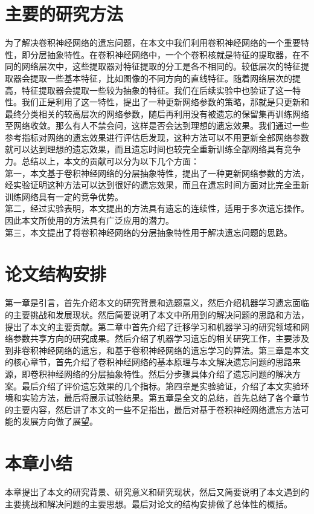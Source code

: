 \section{主要的研究方法}
为了解决卷积神经网络的遗忘问题，在本文中我们利用卷积神经网络的一个重要特性，即分层抽象特性。在卷积神经网络中，一个个卷积核就是特征的提取器，在不同的网络层次中，这些提取器对特征提取的分工是各不相同的。较低层次的特征提取器会提取一些基本特征，比如图像的不同方向的直线特征。随着网络层次的提高，特征提取器会提取一些较为抽象的特征。我们在后续实验中也验证了这一特性。我们正是利用了这一特性，提出了一种更新网络参数的策略，那就是只更新和最终分类相关的较高层次的网络参数，随后再利用没有被遗忘的保留集再训练网络至网络收敛。那么有人不禁会问，这样是否会达到理想的遗忘效果。我们通过一些参考指标对网络的遗忘效果进行评估后发现，这种方法可以不用更新全部网络参数就可以达到理想的遗忘效果，而且遗忘时间也较完全重新训练全部网络具有竞争力。总结以上，本文的贡献可以分为以下几个方面：
\\第一，本文基于卷积神经网络的分层抽象特性，提出了一种更新网络参数的方法，经实验证明这种方法可以达到很好的遗忘效果，而且在遗忘时间方面对比完全重新训练网络具有一定的竞争优势。
\\第二，经过实验表明，本文提出的方法具有遗忘的连续性，适用于多次遗忘操作。因此本文所使用的方法具有广泛应用的潜力。
\\第三，本文提出了将卷积神经网络的分层抽象特性用于解决遗忘问题的思路。
\section{论文结构安排}
第一章是引言，首先介绍本文的研究背景和选题意义，然后介绍机器学习遗忘面临的主要挑战和发展现状。然后简要说明了本文中所用到的解决问题的思路和方法，提出了本文的主要贡献。第二章中首先介绍了迁移学习和机器学习的研究领域和网络参数共享方向的研究成果。然后介绍了机器学习遗忘的相关研究工作，主要涉及到非卷积神经网络的遗忘，和基于卷积神经网络的遗忘学习的算法。第三章是本文的核心章节，首先介绍了卷积神经网络的基本原理与本文解决遗忘问题的思路来源，即卷积神经网络的分层抽象特性。然后分步骤具体介绍了遗忘问题的解决方案。最后介绍了评价遗忘效果的几个指标。第四章是实验验证，介绍了本文实验环境和实验方法，最后将展示试验结果。第五章是全文的总结，首先总结了各个章节的主要内容，然后讲了本文的一些不足指出，最后对基于卷积神经网络遗忘方法可能的发展方向做了展望。
\section{本章小结}
本章提出了本文的研究背景、研究意义和研究现状，然后又简要说明了本文遇到的主要挑战和解决问题的主要思想。最后对论文的结构安排做了总体性的概括。
